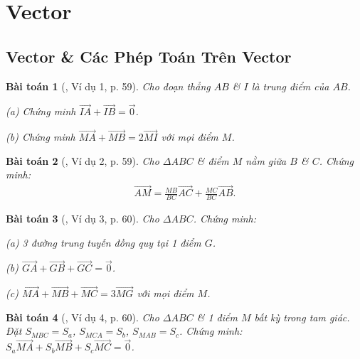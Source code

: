\documentclass{article}
\numberwithin{equation}{section}
\newtheorem{baitoan}{Bài toán}[section]
\begin{document}

\section{Vector}

\subsection{Vector \& Các Phép Toán Trên Vector}

\begin{baitoan}[\cite{Hai_Hung_Thu_Tung2022_tap_1}, Ví dụ 1, p. 59]
	Cho đoạn thẳng $AB$ \& $I$ là trung điểm của $AB$.
	\begin{enumerate*}
		\item[(a)] Chứng minh $\overrightarrow{IA} + \overrightarrow{IB} = \vec{0}$.
		\item[(b)] Chứng minh $\overrightarrow{MA} + \overrightarrow{MB} = 2\overrightarrow{MI}$ với mọi điểm $M$.
	\end{enumerate*}
\end{baitoan}

\begin{baitoan}[\cite{Hai_Hung_Thu_Tung2022_tap_1}, Ví dụ 2, p. 59]
	Cho $\Delta ABC$ \& điểm $M$ nằm giữa $B$ \& $C$. Chứng minh:
	\begin{align*}
		\overrightarrow{AM} = \frac{MB}{BC}\overrightarrow{AC} + \frac{MC}{BC}\overrightarrow{AB}.
	\end{align*}
\end{baitoan}

\begin{baitoan}[\cite{Hai_Hung_Thu_Tung2022_tap_1}, Ví dụ 3, p. 60]
	Cho $\Delta ABC$. Chứng minh:
	\begin{enumerate*}
		\item[(a)] 3 đường trung tuyến đồng quy tại 1 điểm $G$.
		\item[(b)] $\overrightarrow{GA} + \overrightarrow{GB} + \overrightarrow{GC} = \vec{0}$.
		\item[(c)] $\overrightarrow{MA} + \overrightarrow{MB} + \overrightarrow{MC} = 3\overrightarrow{MG}$ với mọi điểm $M$.
	\end{enumerate*}
\end{baitoan}

\begin{baitoan}[\cite{Hai_Hung_Thu_Tung2022_tap_1}, Ví dụ 4, p. 60]
	Cho $\Delta ABC$ \& 1 điểm $M$ bất kỳ trong tam giác. Đặt $S_{MBC} = S_a$, $S_{MCA} = S_b$, $S_{MAB} = S_c$. Chứng minh: $S_a\overrightarrow{MA} + S_b\overrightarrow{MB} + S_c\overrightarrow{MC} = \vec{0}$.
\end{baitoan}
\end{document}
